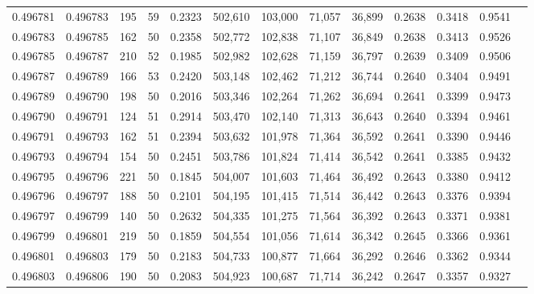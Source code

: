 \begin{tabular}{rrrrrrrrrrrrr}
0.496781 & 0.496783 &   195 &  59 &                                     0.2323 & 502,610 & 103,000 &  71,057 &  36,899 & 0.2638 & 0.3418 & 0.9541 \\
0.496783 & 0.496785 &   162 &  50 &                                     0.2358 & 502,772 & 102,838 &  71,107 &  36,849 & 0.2638 & 0.3413 & 0.9526 \\
0.496785 & 0.496787 &   210 &  52 &                                     0.1985 & 502,982 & 102,628 &  71,159 &  36,797 & 0.2639 & 0.3409 & 0.9506 \\
0.496787 & 0.496789 &   166 &  53 &                                     0.2420 & 503,148 & 102,462 &  71,212 &  36,744 & 0.2640 & 0.3404 & 0.9491 \\
0.496789 & 0.496790 &   198 &  50 &                                     0.2016 & 503,346 & 102,264 &  71,262 &  36,694 & 0.2641 & 0.3399 & 0.9473 \\
0.496790 & 0.496791 &   124 &  51 &                                     0.2914 & 503,470 & 102,140 &  71,313 &  36,643 & 0.2640 & 0.3394 & 0.9461 \\
0.496791 & 0.496793 &   162 &  51 &                                     0.2394 & 503,632 & 101,978 &  71,364 &  36,592 & 0.2641 & 0.3390 & 0.9446 \\
0.496793 & 0.496794 &   154 &  50 &                                     0.2451 & 503,786 & 101,824 &  71,414 &  36,542 & 0.2641 & 0.3385 & 0.9432 \\
0.496795 & 0.496796 &   221 &  50 &                                     0.1845 & 504,007 & 101,603 &  71,464 &  36,492 & 0.2643 & 0.3380 & 0.9412 \\
0.496796 & 0.496797 &   188 &  50 &                                     0.2101 & 504,195 & 101,415 &  71,514 &  36,442 & 0.2643 & 0.3376 & 0.9394 \\
0.496797 & 0.496799 &   140 &  50 &                                     0.2632 & 504,335 & 101,275 &  71,564 &  36,392 & 0.2643 & 0.3371 & 0.9381 \\
0.496799 & 0.496801 &   219 &  50 &                                     0.1859 & 504,554 & 101,056 &  71,614 &  36,342 & 0.2645 & 0.3366 & 0.9361 \\
0.496801 & 0.496803 &   179 &  50 &                                     0.2183 & 504,733 & 100,877 &  71,664 &  36,292 & 0.2646 & 0.3362 & 0.9344 \\
0.496803 & 0.496806 &   190 &  50 &                                     0.2083 & 504,923 & 100,687 &  71,714 &  36,242 & 0.2647 & 0.3357 & 0.9327 \\

\end{tabular}
